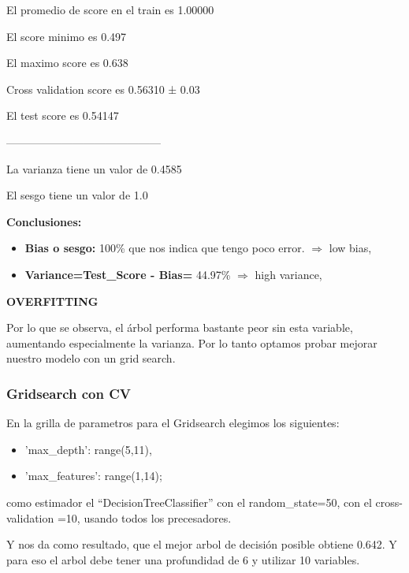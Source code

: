 \documentclass[a4paper]{article}
\begin{document}
            El promedio de score en el train es  1.00000
            
            El score minimo es 0.497
            
            El maximo score es 0.638
            
            Cross validation score es  0.56310 ± 0.03
            
            El test score es  0.54147 
            
            ------------------------------------------
            
            La varianza tiene un valor de 0.4585
            
            El sesgo tiene un valor de 1.0

            \textbf{Conclusiones:}
            \begin{itemize}
                \item \textbf{Bias o sesgo:} 100\% que nos indica que tengo poco error. $\Rightarrow$ low bias,
                \item \textbf{Variance=Test\_Score - Bias=} 44.97\% $\Rightarrow$ high variance,
            \end{itemize}
            
            \textbf{OVERFITTING}

            Por lo que se observa, el árbol performa bastante peor sin esta variable, aumentando especialmente la varianza. Por lo tanto optamos probar mejorar nuestro modelo con un grid search.
        
        \subsubsection{Gridsearch con CV}
            
            En la grilla de parametros para el Gridsearch elegimos los siguientes:
            \begin{itemize}
                \item 'max\_depth': range(5,11),
                \item 'max\_features': range(1,14);
            \end{itemize}
            como estimador el ``DecisionTreeClassifier'' con el random\_state=50, con el cross-validation =10,  usando todos los precesadores.

            Y nos da como resultado, que el mejor arbol de decisión posible obtiene 0.642. Y para eso el arbol debe tener una profundidad de  6  y utilizar  10  variables.
\end{document}
